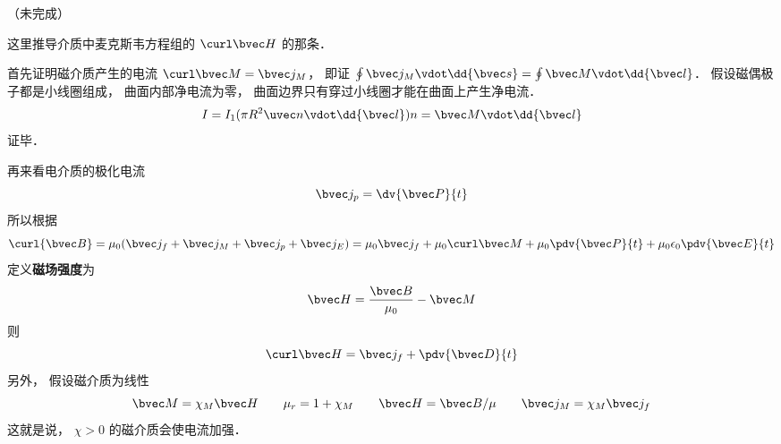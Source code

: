 
（未完成）

这里推导介质中麦克斯韦方程组的 $\curl \bvec H$ 的那条．

首先证明磁介质产生的电流 $\curl \bvec M = \bvec j_M$， 即证 $\oint \bvec j_M \vdot \dd{\bvec s} = \oint \bvec M \vdot \dd{\bvec l}$． 假设磁偶极子都是小线圈组成， 曲面内部净电流为零， 曲面边界只有穿过小线圈才能在曲面上产生净电流．
\begin{equation}
I = I_1 (\pi R^2 \uvec n \vdot \dd{\bvec l}) n = \bvec M \vdot \dd{\bvec l}
\end{equation}
证毕．

再来看电介质的极化电流
\begin{equation}
\bvec j_p = \dv{\bvec P}{t}
\end{equation}
所以根据
\begin{equation}
\curl {\bvec B} = \mu_0 (\bvec j_f + \bvec j_M + \bvec j_p + \bvec j_E) = \mu_0 \bvec j_f + \mu_0 \curl \bvec M + \mu_0 \pdv{\bvec P}{t} + \mu_0 \epsilon_0 \pdv{\bvec E}{t}
\end{equation}
定义\textbf{磁场强度}为
\begin{equation}
\bvec H = \frac{\bvec B}{\mu_0} - \bvec M
\end{equation}
则
\begin{equation}
\curl \bvec H = \bvec j_f + \pdv{\bvec D}{t}
\end{equation}
另外， 假设磁介质为线性
\begin{equation}
\bvec M = \chi_M \bvec H
\qquad
\mu_r = 1 + \chi_M
\qquad
\bvec H = \bvec B/\mu
\qquad
\bvec j_M = \chi_M \bvec j_f
\end{equation}
这就是说， $\chi > 0$ 的磁介质会使电流加强．

